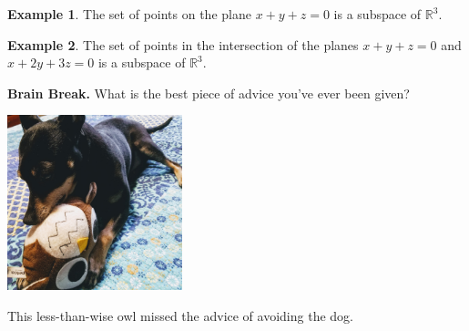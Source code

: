 \documentclass{beamer}
\newcommand{\R}{\mathbb{R}}
\newcommand{\fn}{\insertframenumber}
\theoremstyle{definition}
\newtheorem*{exa}{Example}
\begin{document}
\begin{frame}{\fn}
\begin{exa}
	The set of points on the plane $x+y+z=0$ is a subspace of $\R^3$.
\end{exa}
\begin{exa}
	The set of points in the intersection of the planes $x+y+z=0$ and $x+2y+3z=0$ is a subspace of $\R^3$.
\end{exa}
\end{frame}

\begin{frame}{\fn}
	\begin{block}{\textbf{Brain Break.}}
		What is the best piece of advice you’ve ever been given?
		\begin{center}
			\includegraphics[width=2in]{../images/owl_Pepper}
			
			This less-than-wise owl missed the advice of avoiding the dog.
		\end{center}
	\end{block}	
\end{frame}
\end{document}
